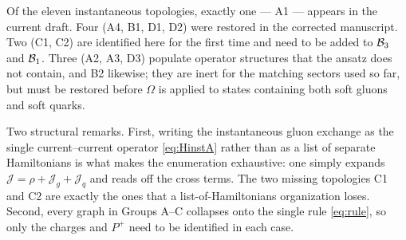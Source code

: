 \documentclass[11pt]{article}
\newcommand{\Jc}{\mathcal{J}}
\begin{document}
\noindent
Of the eleven instantaneous topologies, exactly one --- A1 --- appears in the current draft.
Four (A4, B1, D1, D2) were restored in the corrected manuscript. Two (C1, C2) are identified here
for the first time and need to be added to $\mathcal{B}_{3}$ and $\mathcal{B}_{1}$. Three (A2, A3, D3) populate
operator structures that the ansatz does not contain, and B2 likewise; they are inert for the
matching sectors used so far, but must be restored before $\Omega$ is applied to states
containing both soft gluons and soft quarks.

\medskip\noindent
Two structural remarks. First, writing the instantaneous gluon exchange as the single
current--current operator \eqref{eq:HinstA} rather than as a list of separate Hamiltonians is what
makes the enumeration exhaustive: one simply expands $\Jc=\rho+\Jc_{g}+\Jc_{q}$ and reads off the
cross terms. The two missing topologies C1 and C2 are exactly the ones that a
list-of-Hamiltonians organization loses. Second, every graph in Groups A--C collapses onto the
single rule \eqref{eq:rule}, so only the charges and $P^{+}$ need to be identified in each case.
\end{document}
